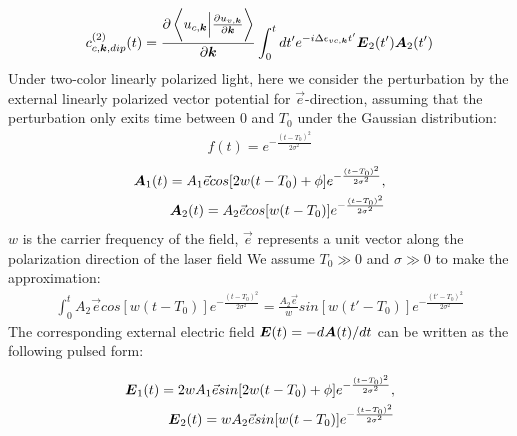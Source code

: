 \begin{align}
     c^{(2)}_{c,\boldsymbol k,dip}(t) =  \frac{\partial \left \langle u_{c,\boldsymbol k}\Big |\frac{\partial u_{v,\boldsymbol k}}{\partial \boldsymbol k} \right \rangle}{\partial \boldsymbol k}   \int_0^t dt' e^{-i \Delta \epsilon_{vc,\boldsymbol k}t'}\boldsymbol E_2(t')  \boldsymbol A_2(t') 
    \label{second_dip}
\end{align}
Under two-color linearly polarized light, here we consider the perturbation by the external linearly polarized vector potential for $\vec e$-direction, assuming that the perturbation only exits time between 0 and $T_0$ under the Gaussian distribution:
\begin{align}
f(t)=e^{-\frac{(t-T_0)^2}{2\sigma^2}}    
\end{align}
\begin{align}
   \boldsymbol A_1(t)=A_1 \vec e cos[2w(t-T_0)+\phi]  e^{-\frac{(t-T_0)^2}{2\sigma^2}}, \\
   \boldsymbol A_2(t)=A_2 \vec e cos[w(t-T_0)]  e^{-\frac{(t-T_0)^2}{2\sigma^2}}
   \label{vector}
\end{align}
$w$ is the carrier frequency of the field,  $\vec{e}$ represents a unit vector along the polarization direction of the laser field
We assume $T_0\gg0$ and $\sigma\gg0$ to make the approximation:
\begin{align}
\int_0^t A_2 \vec e cos[w(t-T_0)]  e^{-\frac{(t-T_0)^2}{2\sigma^2}}=\frac{A_2 \vec e}{w} sin[w(t'-T_0)]  e^{-\frac{(t'-T_0)^2}{2\sigma^2}}    
\end{align}
The corresponding external electric field $\boldsymbol E(t)=-d\boldsymbol A(t)/dt$ can be written as the following pulsed form:

\begin{align}
   \boldsymbol E_1(t)=2wA_1 \vec e sin[2w(t-T_0)+\phi]  e^{-\frac{(t-T_0)^2}{2\sigma^2}}, \\
   \boldsymbol E_2(t)=wA_2 \vec e sin[w(t-T_0)]  e^{-\frac{(t-T_0)^2}{2\sigma^2}}
   \label{feild}
\end{align}

